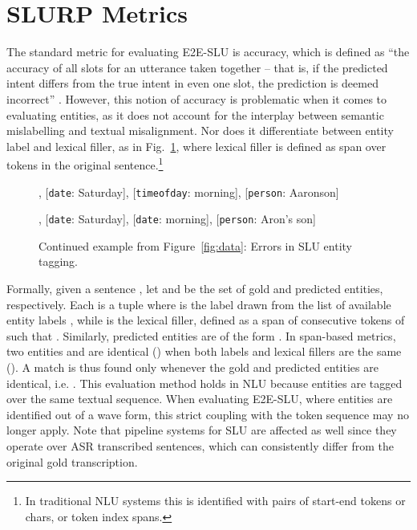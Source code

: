 \documentclass[11pt,a4paper]{article}
\newcommand{\datasetacr}{SLURP}
\newcommand{\etoe}{E2E}
\newcommand{\slu}{SLU}
\newcommand{\asr}{ASR}
\newcommand{\nlu}{NLU}
\begin{document}
\section{\datasetacr{} Metrics}
\label{sec:measure}


The standard metric for evaluating \etoe-\slu{} is accuracy, 
which is defined as ``the accuracy of all slots for an utterance taken together -- that is, if the predicted intent differs from the true intent in even one slot, the prediction is deemed incorrect'' \cite{lugosh19:Interspeech}. 
However, this notion of accuracy is problematic when it comes to evaluating entities, as it does not account for the interplay between semantic mislabelling and textual misalignment. Nor does it differentiate between entity label and lexical filler, as  in Fig.\ \ref{fig:slu_exp}, where lexical filler is defined as span over tokens in the original sentence.\footnote{In traditional \nlu{} systems this is identified with pairs of start-end tokens or chars, or token index spans.}

\begin{figure}
\begin{tcolorbox}
\footnotesize
\begin{description}[noitemsep]
\item[Gold:] [{\tt event\_name}: brunch], [{\tt date}: Saturday], [{\tt timeofday}: morning], [{\tt person}: Aaronson]
\item[SLU:] [{\tt event\_name}: brunch], [{\tt date}: Saturday], [{\tt date}: morning], [{\tt person}: Aron's son]
\end{description}
\end{tcolorbox}
\caption{Continued example from Figure~\ref{fig:data}: Errors in \slu{} entity tagging.}
    \label{fig:slu_exp}
\end{figure}
Formally, given a sentence , let  and  be the set of gold and predicted entities, respectively. Each  is a tuple where  is the label drawn from the list of available entity labels , while  is the lexical filler, defined as a span of consecutive tokens of  such that . Similarly, predicted entities are of the form .
In span-based metrics, two entities  and  are identical () when both labels and lexical fillers are the same (). A match is thus found only whenever the gold and predicted entities are identical, i.e. . This evaluation method holds in \nlu{} because entities are tagged over the same textual sequence. When evaluating \etoe-\slu, where entities are identified out of a wave form, this strict coupling with the token sequence may no longer apply. 
Note that pipeline systems for \slu{} are affected as well since they operate over \asr{} transcribed sentences, which can consistently differ from the original gold transcription. 
\end{document}
